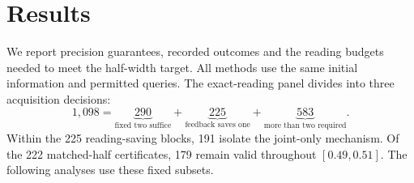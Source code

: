 \section{Results}\label{sec:evaluation}
We report precision guarantees, recorded outcomes and the reading budgets
needed to meet the half-width target. All methods use the same initial
information and permitted queries.
The exact-reading panel divides into three acquisition decisions:
\[
1{,}098=
\underbrace{290}_{\text{fixed two suffice}}+
\underbrace{225}_{\text{feedback saves one}}+
\underbrace{583}_{\text{more than two required}}.
\]
Within the 225 reading-saving blocks, 191 isolate the joint-only mechanism.
Of the 222 matched-half certificates, 179 remain valid throughout
$[0.49,0.51]$. The following analyses use these fixed subsets.
